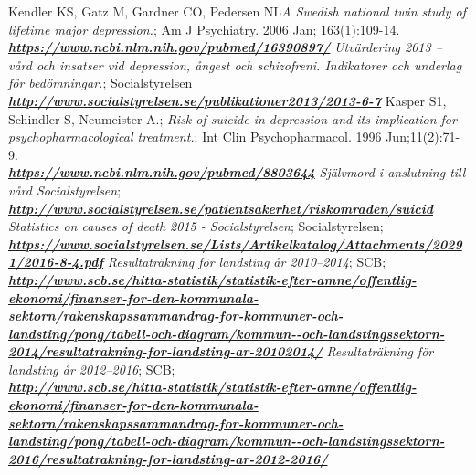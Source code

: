 \documentclass[12pt,a4paper,oneside]{article}
\renewcommand{\_}{\hspace{0.1cm}}
\begin{document}
\begin{thebibliography}{11}
Kendler KS, Gatz M, Gardner CO, Pedersen NL\emph{A Swedish national twin study of lifetime major depression.}; Am J Psychiatry. 2006 Jan; 163(1):109-14.\\\textbf{\emph{\href{https://www.ncbi.nlm.nih.gov/pubmed/16390897/}{\url{https://www.ncbi.nlm.nih.gov/pubmed/16390897/}}}}
 \emph{Utvärdering 2013 -- vård och insatser vid depression, ångest och schizofreni. Indikatorer och underlag för bedömningar.}; Socialstyrelsen\\\textbf{\emph{\href{http://www.socialstyrelsen.se/publikationer2013/2013-6-7}{\url{http://www.socialstyrelsen.se/publikationer2013/2013-6-7}}}}
 Kasper S1, Schindler S, Neumeister A.; \emph{Risk of suicide in depression and its implication for psychopharmacological treatment.}; Int Clin Psychopharmacol. 1996 Jun;11(2):71-9.\\\textbf{\emph{\href{https://www.ncbi.nlm.nih.gov/pubmed/8803644}{\url{https://www.ncbi.nlm.nih.gov/pubmed/8803644}}}}
 \emph{Självmord i anslutning till vård Socialstyrelsen};\\\textbf{\emph{\href{http://www.socialstyrelsen.se/patientsakerhet/riskomraden/suicid}{\url{http://www.socialstyrelsen.se/patientsakerhet/riskomraden/suicid
}}}}
\emph{Statistics on causes of death 2015 - Socialstyrelsen}; Socialstyrelsen;
\\\textbf{\emph{\href{https://www.socialstyrelsen.se/Lists/Artikelkatalog/Attachments/20291/2016-8-4.pdf}{\url{
https://www.socialstyrelsen.se/Lists/Artikelkatalog/Attachments/20291/2016-8-4.pdf}}}}
 \emph{Resultaträkning för landsting år 2010--2014}; SCB;\\\textbf{\emph{\href{ http://www.scb.se/hitta-statistik/statistik-efter-amne/offentlig-ekonomi/finanser-for-den-kommunala-sektorn/rakenskapssammandrag-for-kommuner-och-landsting/pong/tabell-och-diagram/kommun--och-landstingssektorn-2014/resultatrakning-for-landsting-ar-20102014/}{\url{http://www.scb.se/hitta-statistik/statistik-efter-amne/offentlig-ekonomi/finanser-for-den-kommunala-sektorn/rakenskapssammandrag-for-kommuner-och-landsting/pong/tabell-och-diagram/kommun--och-landstingssektorn-2014/resultatrakning-for-landsting-ar-20102014/}}}}
 \emph{Resultaträkning för landsting år 2012--2016}; SCB;\\\textbf{\emph{\href{
http://www.scb.se/hitta-statistik/statistik-efter-amne/offentlig-ekonomi/finanser-for-den-kommunala-sektorn/rakenskapssammandrag-for-kommuner-och-landsting/pong/tabell-och-diagram/kommun--och-landstingssektorn-2016/resultatrakning-for-landsting-ar-2012-2016/}{\url{http://www.scb.se/hitta-statistik/statistik-efter-amne/offentlig-ekonomi/finanser-for-den-kommunala-sektorn/rakenskapssammandrag-for-kommuner-och-landsting/pong/tabell-och-diagram/kommun--och-landstingssektorn-2016/resultatrakning-for-landsting-ar-2012-2016/}}}}

\end{thebibliography}
\end{document}
